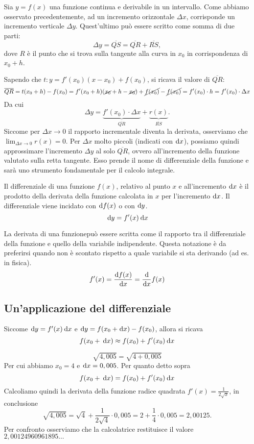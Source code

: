 Sia $y=f(x)$ una funzione continua e derivabile in un intervallo. Come abbiamo osservato precedentemente, ad un incremento orizzontale $\Delta x$, corrisponde un incremento verticale $\Delta y$. Quest'ultimo può essere scritto come somma di due parti:
\[\Delta y=\overline{QS} = \overline{QR}+\overline{RS},\]
dove $R$ è il punto che si trova sulla tangente alla curva in $x_0$ in corrispondenza di $x_0+h$.

Sapendo che $t: y=f'(x_0)(x-x_0)+f(x_0)$, si ricava il valore di $\overline{QR}$:
\[\overline{QR}=t(x_0+h)-f(x_0)=f'(x_0+h)(\cancel{x_0}+h-\cancel{x_0})+\cancel{f(x_0)}-\cancel{f(x_0)}=f'(x_0)\cdot h= f'(x_0)\cdot \Delta x\]
Da cui
\[\Delta y=\underbrace{f'(x_0)\cdot \Delta x}_{\overline{QR}}+\underbrace{r(x)}_{\overline{RS}}.\]
Siccome per $\Delta x\to 0$ il rapporto incrementale diventa la derivata, osserviamo che $\lim_{\Delta x\to 0}r(x)=0$. Per $\Delta x$ molto piccoli (indicati con $\!\:\text{d} x$), possiamo quindi approssimare l'incremento $\Delta y$ al solo $\overline{QR}$, ovvero all'incremento della funzione valutato sulla retta tangente. Esso prende il nome di differenziale della funzione e sarà uno strumento fondamentale per il calcolo integrale.
\begin{boxdef}[Differenziale]
    Il differenziale di una funzione $f(x)$, relativo al punto $x$ e all'incremento $\!\:\text{d} x$ è il prodotto della derivata della funzione calcolata in $x$ per l'incremento $\!\:\text{d} x$. Il differenziale viene incidato con $\!\:\text{d} f(x)$ o con $\!\:\text{d} y$.
    \[\:\text{d} y=f'(x)\:\text{d} x\]
\end{boxdef}
\begin{oss}[Notazione]
    La derivata di una funzionepuò essere scritta come il rapporto tra il differenziale della funzione e quello della variabile indipendente. Questa notazione è da preferirsi quando non è scontato rispetto a quale variabile si sta derivando (ad es. in fisica).
    \[f'(x)=\frac{\!\:\text{d} f(x)}{\!\:\text{d} x}=\frac{\!\:\text{d}}{\!\:\text{d} x}f(x)\]
\end{oss}
\subsection{Un'applicazione del differenziale}
Siccome $\!\:\text{d} y=f'(x)\:\text{d} x$ e $\!\:\text{d} y = f(x_0+\!\:\text{d} x)-f(x_0)$, allora si ricava
\[f(x_0+\:\text{d} x)\approx f(x_0)+f'(x_0)\:\text{d} x\]
\begin{ex}
    \[\sqrt{4,005}=\sqrt{4+0,005}\]
    Per cui abbiamo $x_0=4$ e $\!\:\text{d} x=0,005$. Per quanto detto sopra
    \[f(x_0+\:\text{d} x)=f(x_0)+f'(x_0)\:\text{d} x\]
    Calcoliamo quindi la derivata della funzione radice quadrata $f'(x)=\frac{1}{2\sqrt{x}}$, in conclusione
    \[\sqrt{4,005}=\sqrt{4}+\frac{1}{2\sqrt{4}}\cdot 0,005=2+\frac{1}{4}\cdot 0,005=2,00125.\]
    Per confronto osserviamo che la calcolatrice restituisce il valore $2,00124960961895\dots$
\end{ex}
